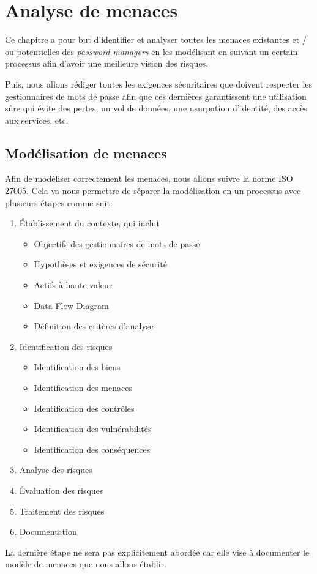 
\chapter{Analyse de menaces}
\label{ch:analyse_menaces}

Ce chapitre a pour but d'identifier et analyser toutes les menaces existantes et / ou potentielles des \textit{password managers} en les modélisant en suivant un certain processus afin d'avoir une meilleure vision des risques.

Puis, nous allons rédiger toutes les exigences sécuritaires que doivent respecter les gestionnaires de mots de passe afin que ces dernières garantissent une utilisation sûre qui évite des pertes, un vol de données, une usurpation d'identité, des accès aux services, etc.

\section{Modélisation de menaces}
Afin de modéliser correctement les menaces, nous allons suivre la norme ISO 27005\cite{ISO27005}. Cela va nous permettre de séparer la modélisation en un processus avec plusieurs étapes comme suit:

\begin{enumerate}
	\item Établissement du contexte, qui inclut
	\begin{itemize}
		\item Objectifs des gestionnaires de mots de passe
		\item Hypothèses et exigences de sécurité
		\item Actifs à haute valeur 
		\item Data Flow Diagram
		\item Définition des critères d'analyse
	\end{itemize}
	\item Identification des risques
		\begin{itemize}
		\item Identification des biens
		\item Identification des menaces
		\item Identification des contrôles
		\item Identification des vulnérabilités
		\item Identification des conséquences
	\end{itemize}
	\item Analyse des risques
	\item Évaluation des risques
	\item Traitement des risques
	\item Documentation 
\end{enumerate}
La dernière étape ne sera pas explicitement abordée car elle vise à documenter le modèle de menaces que nous allons établir.

